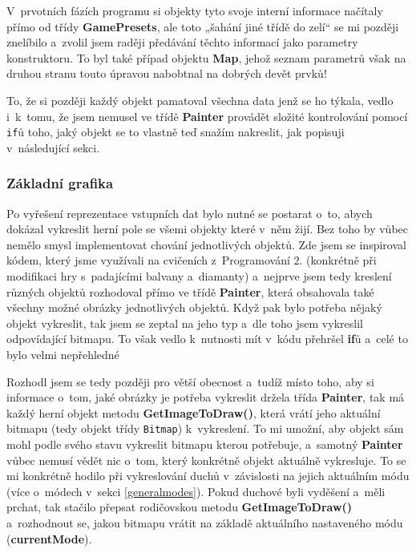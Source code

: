 \documentclass{article}
\begin{document}
V~prvotních fázích programu si objekty tyto svoje interní informace načítaly přímo od třídy \textbf{GamePresets}, ale toto „šahání jiné třídě do zelí“ se mi později znelíbilo a~zvolil jsem raději předávání těchto informací jako parametry konstruktoru. To byl také případ objektu \textbf{Map}, jehož seznam parametrů však na druhou stranu touto úpravou nabobtnal na dobrých devět prvků!

To, že si později každý objekt pamatoval všechna data jenž se ho týkala, vedlo i~k~tomu, že jsem nemusel ve třídě \textbf{Painter} provádět složité kontrolování pomocí \verb|if|ů toho, jaký objekt se to vlastně teď snažím nakreslit, jak popisuji v~následující sekci.

\subsubsection{Základní grafika} \label{staticgraphics}
Po vyřešení reprezentace vstupních dat bylo nutné se postarat o~to, abych dokázal vykreslit herní pole se všemi objekty které v~něm žijí. Bez toho by vůbec nemělo smysl implementovat chování jednotlivých objektů. Zde jsem se inspiroval kódem, který jsme využívali na cvičeních z~Programování 2. (konkrétně při modifikaci hry s~padajícími balvany a~diamanty) a~nejprve jsem tedy kreslení různých objektů rozhodoval přímo ve třídě \textbf{Painter}, která obsahovala také všechny možné obrázky jednotlivých objektů. Když pak bylo potřeba nějaký objekt vykreslit, tak jsem se zeptal na jeho typ a~dle toho jsem vykreslil odpovídající bitmapu. To však vedlo k~nutnosti mít v~kódu přehršel \textbf{if}ů a~celé to bylo velmi nepřehledné

Rozhodl jsem se tedy později pro větší obecnost a~tudíž místo toho, aby si informace o~tom, jaké obrázky je potřeba vykreslit držela třída \textbf{Painter}, tak má každý herní objekt metodu \textbf{GetImageToDraw()}, která vrátí jeho aktuální bitmapu (tedy objekt třídy \verb|Bitmap|) k~vykreslení. To mi umožní, aby objekt sám mohl podle svého stavu vykreslit bitmapu kterou potřebuje, a~samotný \textbf{Painter} vůbec nemusí vědět nic o~tom, který konkrétně objekt aktuálně vykresluje. To se mi konkrétně hodilo při vykreslování duchů v~závislosti na jejich aktuálním módu (více o~módech v~sekci \ref{generalmodes}). Pokud duchové byli vyděšení a~měli prchat, tak stačilo přepsat rodičovskou metodu \textbf{GetImageToDraw()} a~rozhodnout se, jakou bitmapu vrátit na základě aktuálního nastaveného módu (\textbf{currentMode}).
\end{document}
